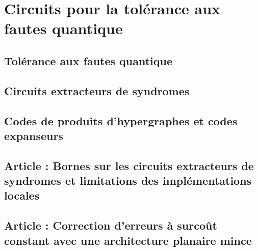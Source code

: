 \begin{comment}
\end{comment}

\chapter{Circuits pour la tolérance aux fautes quantique}

\section{Tolérance aux fautes quantique}

\section{Circuits extracteurs de syndromes}

\section{Codes de produits d'hypergraphes et codes expanseurs}

\section{Article : Bornes sur les circuits extracteurs de syndromes et limitations des implémentations locales}



\section{Article : Correction d'erreurs à surcoût constant avec une architecture planaire mince}




